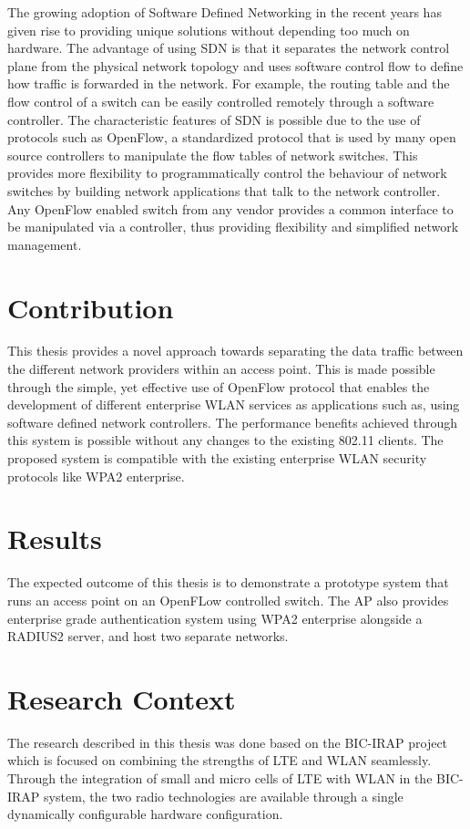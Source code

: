 The growing adoption of Software Defined Networking in the recent years has given rise to providing unique solutions without depending too much on hardware. The advantage of using SDN is that it separates the network control plane from the physical network topology and uses software control flow to define how traffic is forwarded in the network. For example, the routing table and the flow control of a switch can be easily controlled remotely through a software controller. The characteristic features of SDN is possible due to the use of protocols such as OpenFlow, a standardized protocol that is used by many open source controllers to manipulate the flow tables of network switches. This provides more flexibility to programmatically control the behaviour of network switches by building network applications that talk to the network controller. Any OpenFlow enabled switch from any vendor provides a common interface to be manipulated via a controller, thus providing flexibility and simplified network management.

\section{Contribution}\label{sec:contribution}

This thesis provides a novel approach towards separating the data traffic between the different network providers within an access point. This is made possible through the simple, yet effective use of OpenFlow protocol that enables the development of different enterprise WLAN services as applications such as, using software defined network controllers. The performance benefits achieved through this system is possible without any changes to the existing 802.11 clients. The proposed system is compatible with the existing enterprise WLAN security protocols like \gls{WPA2} enterprise.

\section{Results}\label{sec:Results}
The expected outcome of this thesis is to demonstrate a prototype system that runs an access point on an OpenFLow controlled switch. The AP also provides enterprise grade authentication system using WPA2 enterprise alongside a \gls{RADIUS2} server, and host two separate networks. 

\section{Research Context\cite{BIC:IRAP}}\label{sec:BIC-IRAP}
The research described in this thesis was done based on the BIC-IRAP project which is focused on combining the strengths of LTE and WLAN seamlessly. Through the integration of small and micro cells of LTE with WLAN in the BIC-IRAP system, the two radio technologies are available through a single dynamically configurable hardware configuration.

